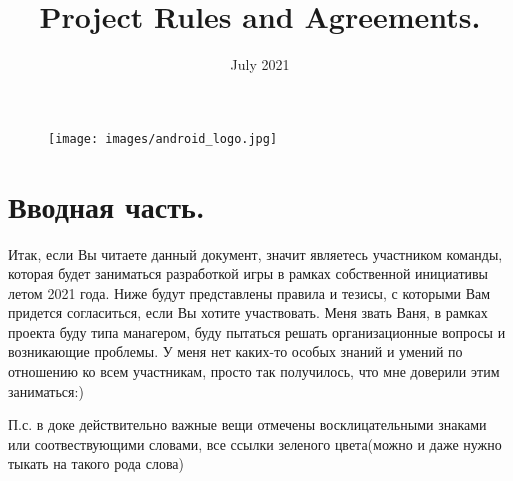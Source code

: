 \documentclass{article}
\date{July 2021}
\title{Project Rules and Agreements.}
\author{}
\begin{document}
\maketitle
\begin{figure}[H]
    \centering
    \texttt{[image: images/android\_logo.jpg]}
\end{figure}

\newpage

\section{Вводная часть.}

Итак, если Вы читаете данный документ, значит являетесь участником команды, которая будет заниматься разработкой игры в рамках собственной инициативы летом 2021 года. Ниже будут представлены правила и тезисы, с которыми Вам придется согласиться, если Вы хотите участвовать. Меня звать Ваня, в рамках проекта буду типа манагером, буду пытаться решать организационные вопросы и возникающие проблемы. У меня нет каких-то особых знаний и умений по отношению ко всем участникам, просто так получилось, что мне доверили этим заниматься:) 


\noindent\newline П.с. в доке действительно важные вещи отмечены восклицательными знаками или соотвествующими словами, все ссылки зеленого цвета(можно и даже нужно тыкать на такого рода слова)
\end{document}
